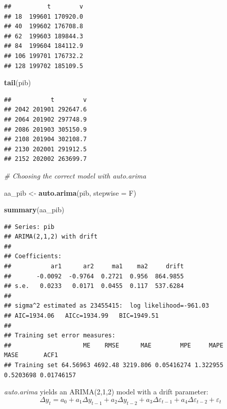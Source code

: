 \documentclass[11pt, a4paper]{report}
\newenvironment{Shaded}{\begin{snugshade}}{\end{snugshade}}
\newcommand{\CommentTok}[1]{\textcolor[rgb]{0.56,0.35,0.01}{\textit{#1}}}
\newcommand{\DataTypeTok}[1]{\textcolor[rgb]{0.13,0.29,0.53}{#1}}
\newcommand{\KeywordTok}[1]{\textcolor[rgb]{0.13,0.29,0.53}{\textbf{#1}}}
\newcommand{\NormalTok}[1]{#1}
\newcommand{\OperatorTok}[1]{\textcolor[rgb]{0.81,0.36,0.00}{\textbf{#1}}}
\newcommand{\StringTok}[1]{\textcolor[rgb]{0.31,0.60,0.02}{#1}}
\theoremstyle{plain}
\theoremstyle{plain}
\theoremstyle{remark}
\begin{document}
\begin{verbatim}
##          t        v
## 18  199601 170920.0
## 40  199602 176708.8
## 62  199603 189844.3
## 84  199604 184112.9
## 106 199701 176732.2
## 128 199702 185109.5
\end{verbatim}

\begin{Shaded}
\begin{Highlighting}[]
\KeywordTok{tail}\NormalTok{(pib)}
\end{Highlighting}
\end{Shaded}

\begin{verbatim}
##           t        v
## 2042 201901 292647.6
## 2064 201902 297748.9
## 2086 201903 305150.9
## 2108 201904 302108.7
## 2130 202001 291912.5
## 2152 202002 263699.7
\end{verbatim}

\begin{Shaded}
\end{Shaded}

\begin{Shaded}
\begin{Highlighting}[]
\CommentTok{# Choosing the correct model with auto.arima}

\NormalTok{aa_pib <-}\StringTok{ }\KeywordTok{auto.arima}\NormalTok{(pib, }\DataTypeTok{stepwise =}\NormalTok{ F)}

\KeywordTok{summary}\NormalTok{(aa_pib)}
\end{Highlighting}
\end{Shaded}

\begin{verbatim}
## Series: pib 
## ARIMA(2,1,2) with drift 
## 
## Coefficients:
##           ar1      ar2     ma1    ma2     drift
##       -0.0092  -0.9764  0.2721  0.956  864.9855
## s.e.   0.0233   0.0171  0.0455  0.117  537.6284
## 
## sigma^2 estimated as 23455415:  log likelihood=-961.03
## AIC=1934.06   AICc=1934.99   BIC=1949.51
## 
## Training set error measures:
##                    ME    RMSE      MAE        MPE     MAPE      MASE       ACF1
## Training set 64.56963 4692.48 3219.806 0.05416274 1.322955 0.5203698 0.01746157
\end{verbatim}

\emph{auto.arima} yields an ARIMA(2,1,2) model with a drift parameter:
\[ \Delta y_t = a_0 + a_1 \Delta y_{t-1} + a_2 \Delta y_{t-2} + a_3 \Delta \varepsilon_{t-1} + a_4 \Delta \varepsilon_{t-2} +\varepsilon_t \]
\end{document}
